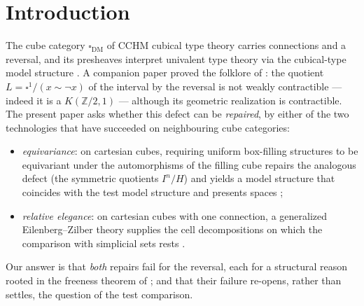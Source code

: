 \documentclass[11pt]{amsart}
\theoremstyle{definition}
\newcommand{\cube}{\square_{\mathrm{DM}}}
\newcommand{\Ldash}{L}
\begin{document}
\maketitle

\section{Introduction}
\label{sec:intro}

The cube category $\cube$ of CCHM cubical type theory \cite{CCHM}
carries connections and a reversal, and its presheaves interpret
univalent type theory via the cubical-type model structure
\cite{SattlerEEP, CoqNote}.  A companion paper \cite{Reversal}
proved the folklore of \cite{CoqML, SatTalk}: the quotient
$\Ldash = \square^1/(x \sim \neg x)$ of the interval by the
reversal is not weakly contractible --- indeed it is a
$K(\mathbb{Z}/2, 1)$ --- although its geometric realization is
contractible.  The present paper asks whether this defect can be
\emph{repaired}, by either of the two technologies that have
succeeded on neighbouring cube categories:

\begin{itemize}
\item \emph{equivariance}: on cartesian cubes, requiring uniform
  box-filling structures to be equivariant under the automorphisms
  of the filling cube repairs the analogous defect (the symmetric
  quotients $I^n/H$) and yields a model structure that coincides
  with the test model structure and presents spaces
  \cite{ACCRS};
\item \emph{relative elegance}: on cartesian cubes with one
  connection, a generalized Eilenberg--Zilber theory supplies the
  cell decompositions on which the comparison with simplicial sets
  rests \cite{CavalloSattlerElegance}.
\end{itemize}

Our answer is that \emph{both} repairs fail for the reversal, each
for a structural reason rooted in the freeness theorem of
\cite{Reversal}; and that their failure re-opens, rather than
settles, the question of the test comparison.
\end{document}
